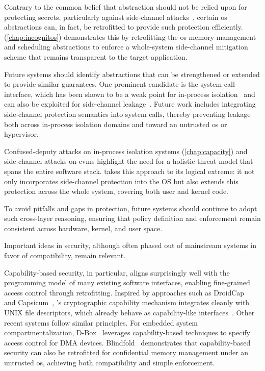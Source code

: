 Contrary to the common belief that abstraction should not be relied upon for protecting secrets, particularly against side-channel attacks~\cite{lampson2021hintsprinciplescomputerdesign}, certain \gls{os} abstractions can, in fact, be retrofitted to provide such protection efficiently.
\incognitos (\cref{chap:incognitos}) demonstrates this by retrofitting the \gls{os} memory-management and scheduling abstractions to enforce a whole-system side-channel mitigation scheme that remains transparent to the target application.

Future systems should identify abstractions that can be strengthened or extended to provide similar guarantees.
One prominent candidate is the system-call interface, which has been shown to be a weak point for in-process isolation~\cite{pku-pitfalls} and can also be exploited for side-channel leakage~\cite{minkyung2025pave,werner2019severest}.
Future work includes integrating side-channel protection semantics into system calls, thereby preventing leakage both across in-process isolation domains and toward an untrusted \gls{os} or hypervisor.


Confused-deputy attacks on in-process isolation systems (\cref{chap:capacity}) and side-channel attacks on \glspl{cvm} highlight the need for a holistic threat model that spans the entire software stack.
\incognitos takes this approach to its logical extreme: it not only incorporates side-channel protection into the OS but also extends this protection across the whole system, covering both user and kernel code.

To avoid pitfalls and gaps in protection, future systems should continue to adopt such cross-layer reasoning, ensuring that policy definition and enforcement remain consistent across hardware, kernel, and user space.


Important ideas in security, although often phased out of mainstream systems in favor of compatibility, remain relevant.

Capability-based security, in particular, aligns surprisingly well with the programming model of many existing software interfaces, enabling fine-grained access control through retrofitting.
Inspired by approaches such as DroidCap~\cite{droidcap} and Capsicum~\cite{watson2010capsicum}, \capacity's cryptographic capability mechanism integrates cleanly with UNIX file descriptors, which already behave as capability-like interfaces~\cite{miller2003capability}.
Other recent systems follow similar principles.
For embedded system compartmentalization, D-Box~\cite{dbox} leverages capability-based techniques to specify access control for DMA devices.
Blindfold~\cite{li2024blindfold} demonstrates that capability-based security can also be retrofitted for confidential memory management under an untrusted \gls{os}, achieving both compatibility and simple enforcement.


